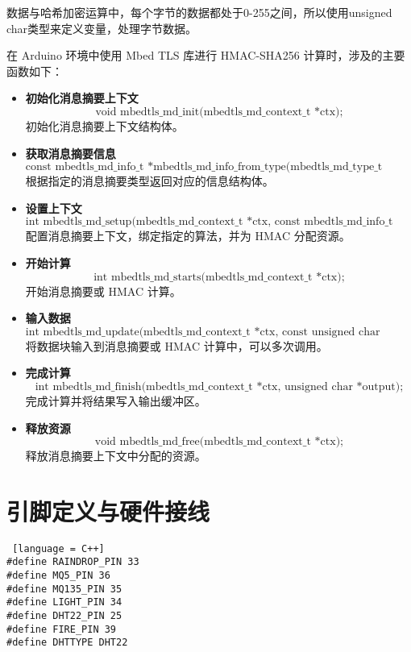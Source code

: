 数据与哈希加密运算中，每个字节的数据都处于0-255之间，所以使用unsigned char类型来定义变量，处理字节数据。

在 Arduino 环境中使用 Mbed TLS 库进行 HMAC-SHA256 计算时，涉及的主要函数如下：

\begin{itemize}
    \item \textbf{初始化消息摘要上下文}
          \[
              \text{void mbedtls\_md\_init(mbedtls\_md\_context\_t *ctx);}
          \]
          初始化消息摘要上下文结构体。

    \item \textbf{获取消息摘要信息}
          \[
              \text{const mbedtls\_md\_info\_t *mbedtls\_md\_info\_from\_type(mbedtls\_md\_type\_t md\_type);}
          \]
          根据指定的消息摘要类型返回对应的信息结构体。

    \item \textbf{设置上下文}
          \[
              \text{int mbedtls\_md\_setup(mbedtls\_md\_context\_t *ctx, const mbedtls\_md\_info\_t *md\_info, int hmac);}
          \]
          配置消息摘要上下文，绑定指定的算法，并为 HMAC 分配资源。

    \item \textbf{开始计算}
          \[
              \text{int mbedtls\_md\_starts(mbedtls\_md\_context\_t *ctx);}
          \]
          开始消息摘要或 HMAC 计算。

    \item \textbf{输入数据}
          \[
              \text{int mbedtls\_md\_update(mbedtls\_md\_context\_t *ctx, const unsigned char *input, size\_t ilen);}
          \]
          将数据块输入到消息摘要或 HMAC 计算中，可以多次调用。

    \item \textbf{完成计算}
          \[
              \text{int mbedtls\_md\_finish(mbedtls\_md\_context\_t *ctx, unsigned char *output);}
          \]
          完成计算并将结果写入输出缓冲区。

    \item \textbf{释放资源}
          \[
              \text{void mbedtls\_md\_free(mbedtls\_md\_context\_t *ctx);}
          \]
          释放消息摘要上下文中分配的资源。
\end{itemize}

\section{引脚定义与硬件接线}

\begin{lstlisting} [language = C++]
#define RAINDROP_PIN 33
#define MQ5_PIN 36
#define MQ135_PIN 35
#define LIGHT_PIN 34
#define DHT22_PIN 25
#define FIRE_PIN 39
#define DHTTYPE DHT22
\end{lstlisting}

